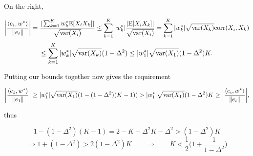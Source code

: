 \noindent On the right,

\[
\bigg\vert \frac{\langle e_i, w^* \rangle}{\Vert e_i \Vert} \bigg\vert
= \frac{\vert\sum_{k=1}^K w^*_k \mathbb{E}[X_i X_k]\vert}{\sqrt{\mathrm{var}(X_i)}}
\le \sum_{k=1}^K \vert w^*_k \vert \frac{\vert \mathbb{E}[X_i X_k]\vert}{\sqrt{\mathrm{var}(X_i)}}
= \sum_{k=1}^K \vert w^*_k \vert \sqrt{\mathrm{var}(X_k)} \mathrm{corr}(X_i, X_k)
\]
\[
\le \sum_{k=1}^K \vert w^*_k \vert \sqrt{\mathrm{var}(X_k)} (1 - \Delta^2)
\le \vert w^*_1 \vert \sqrt{\mathrm{var}(X_1)} (1 - \Delta^2) K.
\]

\noindent Putting our bounds together now gives the requirement

\[
\bigg\vert \frac{\langle e_1, w^* \rangle}{\Vert e_1 \Vert} \bigg\vert
\ge \vert w^*_1 \vert \sqrt{\mathrm{var}(X_1)}(1 - (1 - \Delta^2) (K-1))
> \vert w^*_1 \vert \sqrt{\mathrm{var}(X_1)} (1 - \Delta^2) K
\ge \bigg\vert \frac{\langle e_i, w^* \rangle}{\Vert e_i \Vert} \bigg\vert,
\]

\noindent thus

\[
1 - (1 - \Delta^2) (K-1) = 2 - K + \Delta^2 K - \Delta^2 > (1 - \Delta^2) K
\]
\[
\Rightarrow 1 + (1 - \Delta^2) > 2 (1 - \Delta^2) K
\qquad \Rightarrow \qquad K < \frac{1}{2} \biggl( 1 + \frac{1}{1 - \Delta^2} \biggr)
\]
